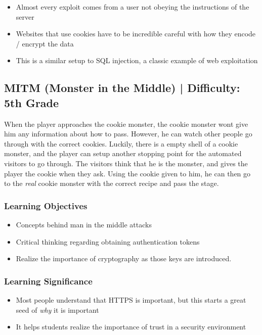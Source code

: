 \documentclass{article}
\begin{document}
\begin{itemize}
  \item Almost every exploit comes from a user not obeying the
    instructions of the server
  \item Websites that use cookies have to be incredible careful with
    how they encode / encrypt the data
  \item This is a similar setup to SQL injection, a classic example of
    web exploitation
\end{itemize}

\subsection{MITM (Monster in the Middle) | Difficulty: 5th Grade}

When the player approaches the cookie monster, the cookie monster wont
give him any information about how to pass. However, he can watch
other people go through with the correct cookies. Luckily, there is a
empty shell of a cookie monster, and the player can setup another
stopping point for the automated visitors to go through. The visitors
think that he is the monster, and gives the player the cookie when
they ask. Using the cookie given to him, he can then go to the
\textit{real} cookie monster with the correct recipe and pass the
stage.

\subsubsection{Learning Objectives}

\begin{itemize}
  \item Concepts behind man in the middle attacks
  \item Critical thinking regarding obtaining authentication tokens
  \item Realize the importance of cryptography as those keys are
    introduced.
\end{itemize}

\subsubsection{Learning Significance}

\begin{itemize}
  \item Most people understand that HTTPS is important, but this
    starts a great seed of \textit{why} it is important
  \item It helps students realize the importance of trust in a
    security environment
\end{itemize}
\end{document}

